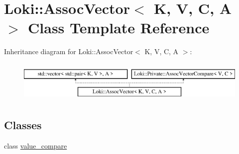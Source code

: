 \hypertarget{classLoki_1_1AssocVector}{}\section{Loki\+:\+:Assoc\+Vector$<$ K, V, C, A $>$ Class Template Reference}
\label{classLoki_1_1AssocVector}
Inheritance diagram for Loki\+:\+:Assoc\+Vector$<$ K, V, C, A $>$\+:\begin{figure}[H]
\begin{center}
\leavevmode
\includegraphics[height=2.000000cm]{classLoki_1_1AssocVector}
\end{center}
\end{figure}
\subsection*{Classes}
\begin{DoxyCompactItemize}
\item 
class \hyperlink{classLoki_1_1AssocVector_1_1value__compare}{value\+\_\+compare}
\end{DoxyCompactItemize}
